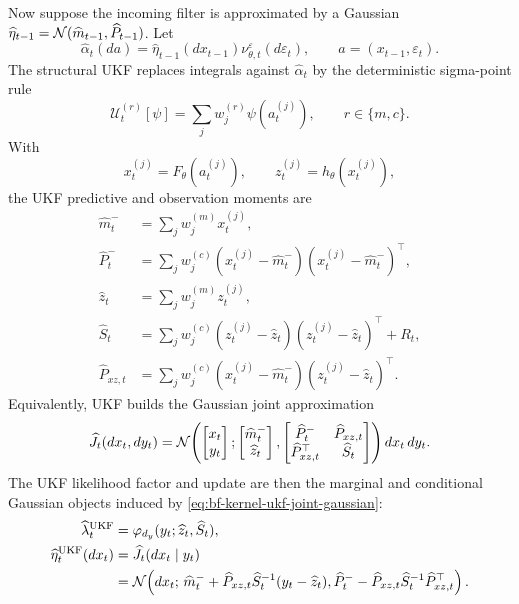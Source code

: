 Now suppose the incoming filter is approximated by a Gaussian
$\widehat\eta_{t-1}=\mathcal{N}(\widehat m_{t-1},\widehat P_{t-1})$.  Let
\begin{equation}
  \widehat\alpha_t(da)
  =
  \widehat\eta_{t-1}(dx_{t-1})
  \nu_{\theta,t}^{\varepsilon}(d\varepsilon_t),
  \qquad
  a=(x_{t-1},\varepsilon_t).
\end{equation}
The structural UKF replaces integrals against $\widehat\alpha_t$ by the
deterministic sigma-point rule
\[
  \mathcal U_t^{(r)}[\psi]
  =
  \sum_j w_j^{(r)}\psi(a_t^{(j)}),
  \qquad r\in\{m,c\}.
\]
With
\[
  x_t^{(j)}=F_\theta(a_t^{(j)}),
  \qquad
  z_t^{(j)}=h_\theta(x_t^{(j)}),
\]
the UKF predictive and observation moments are
\begin{align}
  \widehat m_t^-
    &=
    \sum_j w_j^{(m)}x_t^{(j)},\\
  \widehat P_t^-
    &=
    \sum_j w_j^{(c)}
    (x_t^{(j)}-\widehat m_t^-)(x_t^{(j)}-\widehat m_t^-)^\top,
    \label{eq:bf-kernel-ukf-state-moments}\\
  \widehat z_t
    &=
    \sum_j w_j^{(m)}z_t^{(j)},\\
  \widehat S_t
    &=
    \sum_j w_j^{(c)}
    (z_t^{(j)}-\widehat z_t)(z_t^{(j)}-\widehat z_t)^\top
    +R_t,\\
  \widehat P_{xz,t}
    &=
    \sum_j w_j^{(c)}
    (x_t^{(j)}-\widehat m_t^-)(z_t^{(j)}-\widehat z_t)^\top .
    \label{eq:bf-kernel-ukf-observation-moments}
\end{align}
Equivalently, UKF builds the Gaussian joint approximation
\begin{equation}
  \widehat J_t(dx_t,dy_t)
  =
  \mathcal{N}\!\left(
    \begin{bmatrix}x_t\\ y_t\end{bmatrix};
    \begin{bmatrix}\widehat m_t^-\\ \widehat z_t\end{bmatrix},
    \begin{bmatrix}
      \widehat P_t^- & \widehat P_{xz,t}\\
      \widehat P_{xz,t}^\top & \widehat S_t
    \end{bmatrix}
  \right)dx_t\,dy_t .
  \label{eq:bf-kernel-ukf-joint-gaussian}
\end{equation}
The UKF likelihood factor and update are then the marginal and conditional
Gaussian objects induced by \eqref{eq:bf-kernel-ukf-joint-gaussian}:
\begin{align}
  \widehat\lambda_t^{\mathrm{UKF}}
    &=
    \varphi_{d_y}(y_t;\widehat z_t,\widehat S_t),
    \label{eq:bf-kernel-ukf-likelihood-factor}\\
  \widehat\eta_t^{\mathrm{UKF}}(dx_t)
    &=
    \widehat J_t(dx_t\mid y_t) \nonumber\\
    &=
    \mathcal{N}\!\left(
      dx_t;\,
      \widehat m_t^-+
      \widehat P_{xz,t}\widehat S_t^{-1}(y_t-\widehat z_t),
      \widehat P_t^--
      \widehat P_{xz,t}\widehat S_t^{-1}\widehat P_{xz,t}^\top
    \right).
    \label{eq:bf-kernel-ukf-gaussian-update}
\end{align}
